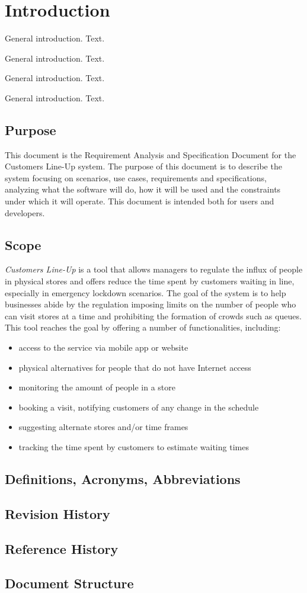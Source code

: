 \section{Introduction}\label{sec:intro}

General introduction. Text.

General introduction. Text.

General introduction. Text.

General introduction. Text.

\subsection{Purpose}
This document is the Requirement Analysis and Specification Document for the Customers Line-Up system.
The purpose of this document is to describe the system focusing on scenarios, use cases, requirements and specifications,
analyzing what the software will do, how it will be used and the constraints under which it will operate.
This document is intended both for users and developers.

\subsection{Scope}

\emph{Customers Line-Up} is a tool that allows managers to regulate the influx of people in physical stores and offers
reduce the time spent by customers waiting in line, especially in emergency lockdown scenarios.
The goal of the system is to help businesses abide by the regulation imposing limits on the number of people
who can visit stores at a time and prohibiting the formation of crowds such as queues.
This tool reaches the goal by offering a number of functionalities, including:
\begin{itemize}
    \item access to the service via mobile app or website
    \item physical alternatives for people that do not have Internet access
    \item monitoring the amount of people in a store
    \item booking a visit, notifying customers of any change in the schedule
    \item suggesting alternate stores and/or time frames
    \item tracking the time spent by customers to estimate waiting times
\end{itemize}

\subsection{Definitions, Acronyms, Abbreviations}
\subsection{Revision History}
\subsection{Reference History}
\subsection{Document Structure}

